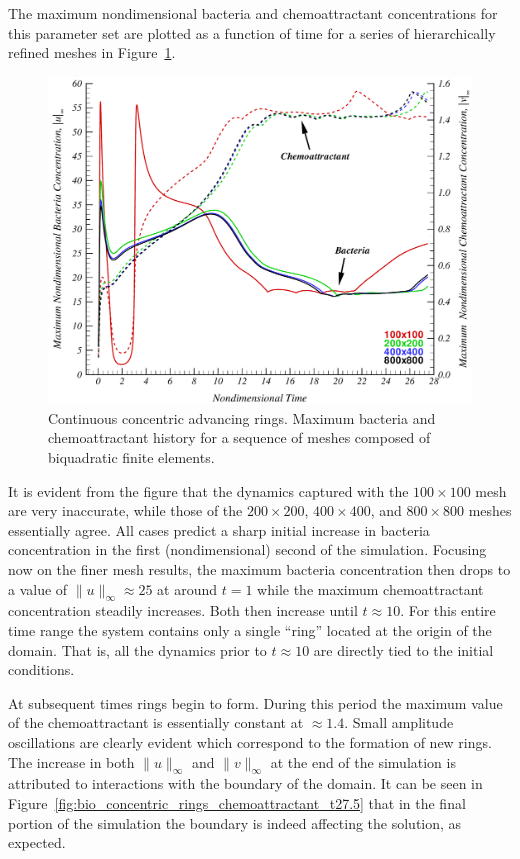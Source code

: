 The maximum nondimensional bacteria and chemoattractant concentrations for this parameter set are plotted as a function of time for a series of hierarchically refined meshes in Figure~\ref{fig:bio_concentric_rings_max_history}.
\begin{figure}[hbp]
  \begin{center}
    \includegraphics[width=\textwidth]{figures/bio_concentric_rings/max_history}
    \caption{Continuous concentric advancing rings. Maximum bacteria and chemoattractant history for a sequence of meshes composed of biquadratic finite elements.\label{fig:bio_concentric_rings_max_history}}
  \end{center}
\end{figure}
It is evident from the figure that the dynamics captured with the $100 \times 100$ mesh are very inaccurate, while those of the $200 \times 200$,  $400 \times 400$, and $800 \times 800$ meshes essentially agree.  All cases predict a sharp initial increase in bacteria concentration in the first (nondimensional) second of the simulation.  Focusing now on the finer mesh results, the maximum bacteria concentration then drops to a value of $\|u\|_\infty\approx 25$ at around $t=1$ while the maximum chemoattractant concentration steadily increases.  Both then increase until $t\approx 10$.  For this entire time range the system contains only a single ``ring'' located at the origin of the domain.  That is, all the dynamics prior to $t\approx 10$ are directly tied to the initial conditions.

At subsequent times rings begin to form. During this period the maximum value of the chemoattractant is essentially constant at $\approx 1.4$.  Small amplitude oscillations are clearly evident which correspond to the formation of new rings.  The increase in both $\|u\|_\infty$ and $\|v\|_\infty$ at the end of the simulation is attributed to interactions with the boundary of the domain. It can be seen in Figure~\ref{fig:bio_concentric_rings_chemoattractant_t27.5} that in the final portion of the simulation the boundary is indeed affecting the solution, as expected.

